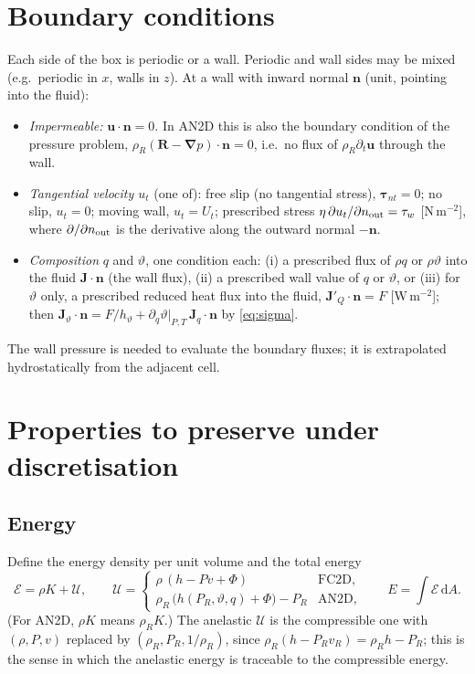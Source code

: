 \documentclass[11pt,a4paper]{article}
\newcommand{\vt}{\vartheta}                    %
\newcommand{\hth}{{h_{\vartheta}}}               %
\newcommand{\bu}{\mathbf{u}}
\newcommand{\bn}{\mathbf{n}}
\newcommand{\bJ}{\mathbf{J}}
\newcommand{\bnabla}{\boldsymbol{\nabla}}
\newcommand{\btau}{\boldsymbol{\tau}}
\begin{document}
\section{Boundary conditions}\label{sec:bc}
Each side of the box is periodic or a wall. Periodic and wall sides may be mixed (e.g.\ periodic in $x$, walls in $z$).
At a wall with inward normal $\bn$ (unit, pointing into the fluid):
\begin{itemize}
  \item \emph{Impermeable:} $\bu\cdot\bn=0$. In AN2D this is also the boundary condition of the pressure problem,
        $\rho_R(\mathbf R-\bnabla p)\cdot\bn=0$, i.e.\ no flux of $\rho_R\partial_t\bu$ through the wall.
  \item \emph{Tangential velocity $u_t$} (one of): free slip (no tangential stress), $\btau_{nt}=0$;
        no slip, $u_t=0$; moving wall, $u_t=U_t$; prescribed stress $\eta\,\partial u_t/\partial n_{\rm out}=\tau_w$ [N\,m$^{-2}$],
        where $\partial/\partial n_{\rm out}$ is the derivative along the outward normal $-\bn$.
  \item \emph{Composition} $q$ and \emph{$\vt$}, one condition each: (i) a prescribed flux of $\rho q$ or $\rho\vt$ into the fluid
        $\bJ\cdot\bn$ (the wall flux), (ii) a prescribed wall value of $q$ or $\vt$, or (iii) for $\vt$ only, a prescribed
        reduced heat flux into the fluid, $\bJ'_Q\cdot\bn=F$ [W\,m$^{-2}$]; then $\bJ_\vt\cdot\bn=F/\hth+\partial_q\vt|_{P,T}\,\bJ_q\cdot\bn$
        by \eqref{eq:sigma}.
\end{itemize}
The wall pressure is needed to evaluate the boundary fluxes; it is extrapolated hydrostatically from the adjacent cell.

\section{Properties to preserve under discretisation}\label{sec:conservation}
\subsection{Energy}
Define the energy density per unit volume and the total energy
\begin{equation}
  \mathcal E=\rho K+\mathcal U,\qquad
  \mathcal U=\begin{cases}
    \rho\,(h-Pv+\Phi) & \text{FC2D},\\[2pt]
    \rho_R\,\big(h(P_R,\vt,q)+\Phi\big) - P_R & \text{AN2D},
  \end{cases}\qquad
  E=\int\mathcal E\,\mathrm{d}A .
\end{equation}
(For AN2D, $\rho K$ means $\rho_RK$.) The anelastic $\mathcal U$ is the compressible one with $(\rho,P,v)$ replaced by $(\rho_R,P_R,1/\rho_R)$, since
$\rho_R(h-P_Rv_R)=\rho_Rh-P_R$; this is the sense in which the anelastic energy is traceable to the compressible energy.
\end{document}

